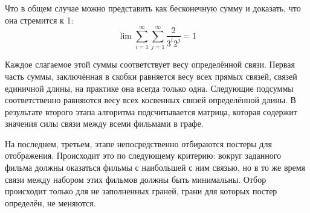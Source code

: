 \documentclass[oneside,final,12pt]{extreport}
\begin{document}
Что в общем случае можно представить как бесконечную сумму и доказать, что она стремится к 1:
\[ \lim \sum_{i=1}^{\infty} \sum_{j=1}^{\infty} \frac{2}{ 3^{i} 2^{j} } = 1 \]

Каждое слагаемое этой суммы соответствует весу определённой связи. Первая часть суммы, заключённая в скобки равняется весу всех прямых связей, связей единичной длины, на практике она всегда только одна. Следующие подсуммы соответственно равняются весу всех косвенных связей определённой длины. В результате второго этапа алгоритма подсчитывается матрица, которая содержит значения силы связи между всеми фильмами в графе.

На последнем, третьем, этапе непосредственно отбираются постеры для отображения. Происходит это по следующему критерию: вокруг заданного фильма должны оказаться фильмы с наибольшей с ним связью, но в то же время связи между набором этих фильмов должны быть минимальны. Отбор происходит только для не заполненных граней, грани для которых постер определён, не меняются.
\end{document}
